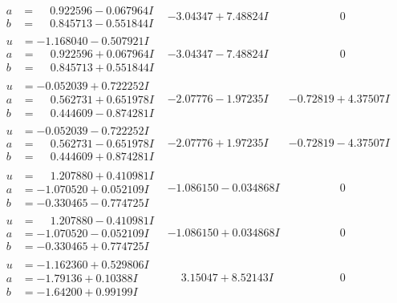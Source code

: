 \documentclass[1p]{elsarticle_modified}
\theoremstyle{definition}
\begin{document}
$$\begin{array}{c|c|c}
\begin{aligned}
a &= \phantom{-}0.922596 - 0.067964 I \\
b &= \phantom{-}0.845713 - 0.551844 I\end{aligned}
 & -3.04347 + 7.48824 I & \phantom{-0.000000 } 0 \\ \hline\begin{aligned}
u &= -1.168040 - 0.507921 I \\
a &= \phantom{-}0.922596 + 0.067964 I \\
b &= \phantom{-}0.845713 + 0.551844 I\end{aligned}
 & -3.04347 - 7.48824 I & \phantom{-0.000000 } 0 \\ \hline\begin{aligned}
u &= -0.052039 + 0.722252 I \\
a &= \phantom{-}0.562731 + 0.651978 I \\
b &= \phantom{-}0.444609 - 0.874281 I\end{aligned}
 & -2.07776 - 1.97235 I & -0.72819 + 4.37507 I \\ \hline\begin{aligned}
u &= -0.052039 - 0.722252 I \\
a &= \phantom{-}0.562731 - 0.651978 I \\
b &= \phantom{-}0.444609 + 0.874281 I\end{aligned}
 & -2.07776 + 1.97235 I & -0.72819 - 4.37507 I \\ \hline\begin{aligned}
u &= \phantom{-}1.207880 + 0.410981 I \\
a &= -1.070520 + 0.052109 I \\
b &= -0.330465 - 0.774725 I\end{aligned}
 & -1.086150 - 0.034868 I & \phantom{-0.000000 } 0 \\ \hline\begin{aligned}
u &= \phantom{-}1.207880 - 0.410981 I \\
a &= -1.070520 - 0.052109 I \\
b &= -0.330465 + 0.774725 I\end{aligned}
 & -1.086150 + 0.034868 I & \phantom{-0.000000 } 0 \\ \hline\begin{aligned}
u &= -1.162360 + 0.529806 I \\
a &= -1.79136 + 0.10388 I \\
b &= -1.64200 + 0.99199 I\end{aligned}
 & \phantom{-}3.15047 + 8.52143 I & \phantom{-0.000000 } 0 \\ \hline\begin{aligned}

\end{aligned}
\end{array}$$
\end{document}
